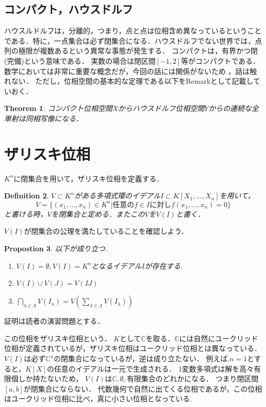 \documentclass{ujarticle}
\newtheorem{thm}{Theorem}[section]
\newtheorem{dfn}[thm]{Definition}
\newtheorem{prop}[thm]{Propostion}
\begin{document}
\subsection{コンパクト，ハウスドルフ}
\label{sub:コンパクト，ハウスドルフ}
ハウスルドルフは，分離的，つまり，点と点は位相含め異なっているということである．特に，一点集合は必ず閉集合になる．ハウスドルフでない世界では，点列の極限が複数あるという異常な事態が発生する．
コンパクトは，有界かつ閉(完備)という意味である．
実数の場合は閉区間$[-1,2]$等がコンパクトである．
数学においては非常に重要な概念だが，今回の話には関係がないため
，話は触れない．
ただし，位相空間の基本的な定理である以下をRemarkとして記載していおく．
\begin{thm}
コンパクト位相空間$X$からハウスドルフ位相空間$Y$からの連続な全単射は同相写像になる．
\end{thm}





\section{ザリスキ位相}
\label{sub:ザリスキ位相}

$K^n$に閉集合を用いて，ザリスキ位相を定義する．
\begin{dfn}
 $V \subset K^n$がある多項式環のイデアル$I \subset K[X_1,\dots,X_n]$を用いて，
\begin{equation*}
   V = \{ (x_1,\dots,x_n) \in K^n | \mbox{任意の} f \in I \mbox{に対し} f(x_1, \dots,x_n)=0 \}
\end{equation*}
と書ける時，$V$を閉集合と定める．またこの$V$を$V(I)$と書く．
\end{dfn}

$V(I)$が閉集合の公理を満たしていることを確認しよう．
\begin{prop}
 以下が成り立つ.
 \begin{enumerate}
   \item $V(I) = \emptyset ,　V(I) = K^n$となるイデアル$I$が存在する.
   \item $V(I) \cup V(J) = V(IJ)$
   \item $\bigcap_{\lambda \in \Lambda}V(I_{\lambda})=V(\sum_{\lambda \in \Lambda}V(I_\lambda))$
 \end{enumerate}
\end{prop}
証明は読者の演習問題とする．

この位相をザリスキ位相という．
$K$として$\mathbb{C}$を取る．$\mathbb{C}$には自然にユークリッド位相が定義されているが，ザリスキ位相はユークリッド位相とは異なっている．$V(I)$は必ず$\mathbb{C}^n$の閉集合になっているが，逆は成り立たない．
例えば,$n=1$とすると，$K[X]$の任意のイデアルは一元で生成される．
1変数多項式は解を高々有限個しか持たないため，
$V(I)$は$\mathbb{C},\emptyset,$有限集合のどれかになる．
つまり閉区間$[a,b]$が閉集合にならない．
代数幾何で自然に出てくる位相であるが，この位相はユークリッド位相に比べ，真に小さい位相となっている.
\end{document}

